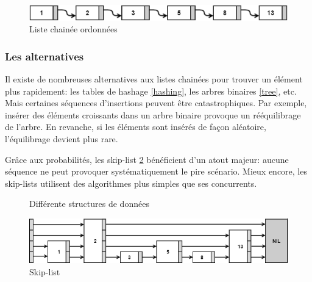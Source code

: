 \documentclass[hidelinks,a4paper, 12pt]{article}
\begin{document}
	\begin{figure}[h]
		\includegraphics[width=\textwidth]{img/linkedList}
		\caption{Liste chainée ordonnées}
		\label{LinkedList}
	\end{figure}
	
	\subsubsection*{Les alternatives}
	Il existe de nombreuses alternatives aux listes chainées pour trouver un élément plus rapidement: les tables de hashage \cref{hashing}, les arbres binaires \cref{tree}, etc. Mais certaines séquences d'insertions peuvent être catastrophiques. Par exemple, insérer des éléments croissants dans un arbre binaire provoque un rééquilibrage de l'arbre. En revanche, si les éléments sont insérés de façon aléatoire, l'équilibrage devient plus rare.

	Grâce aux probabilités, les \og skip-list \fg{} \cref{skip} bénéficient d'un atout majeur: aucune séquence ne peut provoquer systématiquement le pire scénario. Mieux encore, les skip-lists utilisent des algorithmes plus simples que ses concurrents.
	
	\begin{figure}[h]
		\centering
		\caption{Différente structures de données}
	\end{figure}
	\begin{figure}
		\includegraphics[width=\textwidth]{img/skip}
		\caption{Skip-list}
		\label{skip}
	\end{figure}
	
\end{document}
